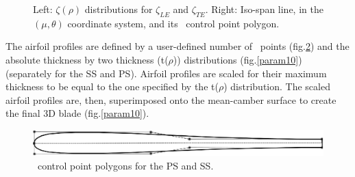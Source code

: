\begin{figure}[h!]
\begin{minipage}[b]{1\linewidth}
 \centering
\end{minipage}
\caption{Left: $\zeta(\rho)$ distributions for $\zeta_{LE}$ and $\zeta_{TE}$. Right: Iso-span line, in the $(\mu,\theta)$ coordinate system, and its \Bezier\ control point polygon.}
\label{param7}
\end{figure}

The airfoil profiles are defined by a user-defined number of \Bezier\ points (fig.\ref{param8}) and the absolute thickness by two thickness (t($\rho$)) distributions (fig.\ref{param10}) (separately for the SS and PS). Airfoil profiles are scaled for their maximum thickness to be equal to the one specified by the t($\rho$) distribution. The scaled airfoil profiles are, then, superimposed onto the mean-camber surface to create the final 3D blade (fig.\ref{param10}).  

\begin{figure}[h!]
\centering
\includegraphics[width=150mm]{param8.eps} 
\caption{\Bezier\ control point polygons for the PS and SS.}
\label{param8}
\end{figure}



